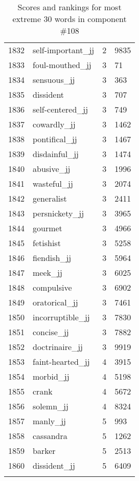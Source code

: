 \begin{longtable}[!htbp]{| rlr@{.}l |}
    1832 & self-important\_jj & 2 & 9835 \\
    1833 & foul-mouthed\_jj & 3 & 71 \\
    1834 & sensuous\_jj & 3 & 363 \\
    1835 & dissident & 3 & 707 \\
    1836 & self-centered\_jj & 3 & 749 \\
    1837 & cowardly\_jj & 3 & 1462 \\
    1838 & pontifical\_jj & 3 & 1467 \\
    1839 & disdainful\_jj & 3 & 1474 \\
    1840 & abusive\_jj & 3 & 1996 \\
    1841 & wasteful\_jj & 3 & 2074 \\
    1842 & generalist & 3 & 2411 \\
    1843 & persnickety\_jj & 3 & 3965 \\
    1844 & gourmet & 3 & 4966 \\
    1845 & fetishist & 3 & 5258 \\
    1846 & fiendish\_jj & 3 & 5964 \\
    1847 & meek\_jj & 3 & 6025 \\
    1848 & compulsive & 3 & 6902 \\
    1849 & oratorical\_jj & 3 & 7461 \\
    1850 & incorruptible\_jj & 3 & 7830 \\
    1851 & concise\_jj & 3 & 7882 \\
    1852 & doctrinaire\_jj & 3 & 9919 \\
    1853 & faint-hearted\_jj & 4 & 3915 \\
    1854 & morbid\_jj & 4 & 5198 \\
    1855 & crank & 4 & 5672 \\
    1856 & solemn\_jj & 4 & 8324 \\
    1857 & manly\_jj & 5 & 993 \\
    1858 & cassandra & 5 & 1262 \\
    1859 & barker & 5 & 2513 \\
    1860 & dissident\_jj & 5 & 6409 \\
    \hline
    \caption{Scores and rankings for most extreme 30 words in component \#108} \\
\end{longtable}
